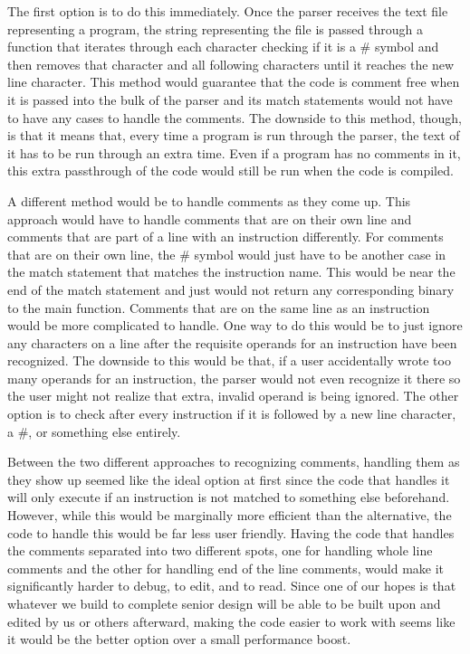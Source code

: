 \documentclass[parskip=half, fontsize=12pt]{scrartcl}
\begin{document}
The first option is to do this immediately. Once the parser receives the
text file representing a program, the string representing the file is
passed through a function that iterates through each character checking
if it is a \# symbol and then removes that character and all following
characters until it reaches the new line character. This method would
guarantee that the code is comment free when it is passed into the bulk
of the parser and its match statements would not have to have any cases
to handle the comments. The downside to this method, though, is that it
means that, every time a program is run through the parser, the text of
it has to be run through an extra time. Even if a program has no
comments in it, this extra passthrough of the code would still be run
when the code is compiled.

A different method would be to handle comments as they come up. This
approach would have to handle comments that are on their own line and
comments that are part of a line with an instruction differently. For
comments that are on their own line, the \# symbol would just have to be
another case in the match statement that matches the instruction name.
This would be near the end of the match statement and just would not
return any corresponding binary to the main function. Comments that are
on the same line as an instruction would be more complicated to handle.
One way to do this would be to just ignore any characters on a line
after the requisite operands for an instruction have been recognized.
The downside to this would be that, if a user accidentally wrote too
many operands for an instruction, the parser would not even recognize it
there so the user might not realize that extra, invalid operand is being
ignored. The other option is to check after every instruction if it is
followed by a new line character, a \#, or something else entirely.

Between the two different approaches to recognizing comments, handling
them as they show up seemed like the ideal option at first since the
code that handles it will only execute if an instruction is not matched
to something else beforehand. However, while this would be marginally
more efficient than the alternative, the code to handle this would be
far less user friendly. Having the code that handles the comments
separated into two different spots, one for handling whole line comments
and the other for handling end of the line comments, would make it
significantly harder to debug, to edit, and to read. Since one of our
hopes is that whatever we build to complete senior design will be able
to be built upon and edited by us or others afterward, making the code
easier to work with seems like it would be the better option over a
small performance boost.
\end{document}
